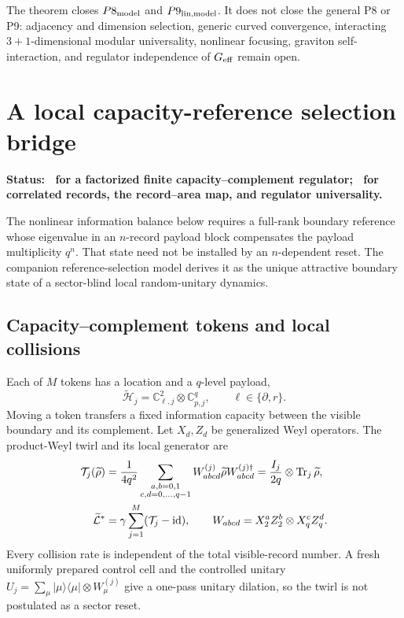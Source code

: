 The theorem closes \(P8_{\rm model}\) and \(P9_{\rm lin,model}\).  It does not
close the general P8 or P9: adjacency and dimension selection, generic curved
convergence, interacting \(3+1\)-dimensional modular universality, nonlinear
focusing, graviton self-interaction, and regulator independence of
\(G_{\rm eff}\) remain open.

\section{A local capacity-reference selection bridge}
\label{sec:capacity-reference-selection}

\textbf{Status: \StatusModel\ for a factorized finite
capacity--complement regulator; \StatusOpen\ for correlated records, the
record--area map, and regulator universality.}

The nonlinear information balance below requires a full-rank boundary
reference whose eigenvalue in an \(n\)-record payload block compensates the
payload multiplicity \(q^n\).  That state need not be installed by an
\(n\)-dependent reset.  The companion reference-selection model
\cite{XuCapacityReference2026} derives it as the unique attractive boundary
state of a sector-blind local random-unitary dynamics.

\subsection{Capacity--complement tokens and local collisions}

Each of \(M\) tokens has a location and a \(q\)-level payload,
\begin{equation}
 \widetilde{\mathcal H}_j
 =\mathbb C^2_{\ell,j}\otimes\mathbb C^q_{p,j},
 \qquad
 \ell\in\{\partial,r\}.
 \label{eq:reference-token}
\end{equation}
Moving a token transfers a fixed information capacity between the visible
boundary and its complement.  Let \(X_d,Z_d\) be generalized Weyl operators.
The product-Weyl twirl and its local generator are
\begin{align}
 \mathcal T_j(\widetilde\rho)
 &=\frac{1}{4q^2}
 \sum_{\substack{a,b=0,1\\c,d=0,\ldots,q-1}}
 W_{abcd}^{(j)}\widetilde\rho W_{abcd}^{(j)\dagger}
 =\frac{I_j}{2q}\otimes\operatorname{Tr}_j\widetilde\rho ,
 \label{eq:reference-twirl}\\
 \widetilde{\mathcal L}^{*}
 &=\gamma\sum_{j=1}^{M}(\mathcal T_j-\mathrm{id}),\qquad
 W_{abcd}=X_2^aZ_2^b\otimes X_q^cZ_q^d .
 \label{eq:reference-generator}
\end{align}
Every collision rate is independent of the total visible-record number.  A
fresh uniformly prepared control cell and the controlled unitary
\(U_j=\sum_\mu|\mu\rangle\langle\mu|\otimes W_\mu^{(j)}\) give a one-pass
unitary dilation, so the twirl is not postulated as a sector reset.

